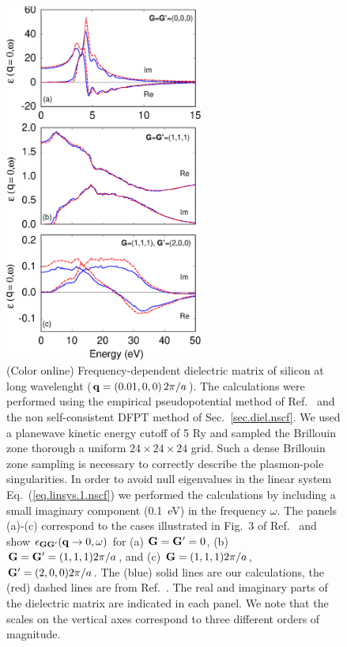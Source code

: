 \documentclass[twocolumn,prb,showpacs,superscriptaddress]{revtex4}
\def\w{\omega}
\def\q{{\bf q}}
\def\G{{\bf G}}
\def\Gp{{\bf G^\prime}}
\begin{document}
\begin  {figure}
\begin  {center}
\includegraphics[width=6.5cm]{fig2.eps}
\end    {center}
\caption{\label{fig2}
        (Color online)
        Frequency-dependent dielectric matrix of silicon at long wavelenght ($\q=(0.01,0,0) \, 2\pi/a$).
        The calculations were performed using the empirical pseudopotential method of Ref.\  
        and the non self-consistent DFPT method of Sec.\ \ref{sec.diel.nscf}.
        We used a planewave kinetic energy cutoff of 5 Ry and sampled the Brillouin zone thorough a uniform 
        $24\times 24\times 24$ grid. Such a dense Brillouin zone sampling is necessary to correctly describe
        the plasmon-pole singularities. In order to avoid null eigenvalues in the linear system Eq.\ (\ref{eq.linsys.1.nscf})
        we performed the calculations by including a small imaginary component (0.1~eV) in the frequency $\w$.
        The panels (a)-(c) correspond to the cases illustrated in Fig.\ 3 of Ref.\ 
        and show $\epsilon_{\G\Gp}(\q\rightarrow 0,\w)$ for (a) $\G=\Gp=0$, (b) $\G=\Gp=(1,1,1) 2\pi/a$,
        and (c) $\G=(1,1,1) 2\pi/a$, $\Gp=(2,0,0) 2\pi/a$.
        The (blue) solid lines are our calculations, the (red) dashed lines are from Ref.\ .
        The real and imaginary parts of the dielectric matrix are indicated in each panel.
        We note that the scales on the vertical axes correspond to three different orders of magnitude.
        }
\end    {figure}
\end{document}
